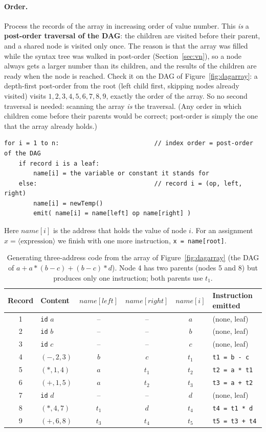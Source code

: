 \documentclass[11pt,a4paper]{article}
\begin{document}
\paragraph{Order.} Process the records of the array in increasing order of value number. This \emph{is} a \textbf{post-order traversal of the DAG}: the children are visited before their parent, and a shared node is visited only once. The reason is that the array was filled while the syntax tree was walked in post-order (Section~\ref{sec:vn}), so a node always gets a larger number than its children, and the results of the children are ready when the node is reached. Check it on the DAG of Figure~\ref{fig:dagarray}: a depth-first post-order from the root (left child first, skipping nodes already visited) visits $1,2,3,4,5,6,7,8,9$, exactly the order of the array. So no second traversal is needed: scanning the array \emph{is} the traversal. (Any order in which children come before their parents would be correct; post-order is simply the one that the array already holds.)

\begin{lstlisting}
for i = 1 to n:                          // index order = post-order of the DAG
    if record i is a leaf:
        name[i] = the variable or constant it stands for
    else:                                // record i = (op, left, right)
        name[i] = newTemp()
        emit( name[i] = name[left] op name[right] )
\end{lstlisting}
Here $\mathit{name}[i]$ is the address that holds the value of node $i$. For an assignment $x = \langle\text{expression}\rangle$ we finish with one more instruction, \texttt{x = name[root]}.

\begin{table}[H]
\centering
\small
\begin{tabular}{@{}c l c c c l@{}}
\toprule
\textbf{Record} & \textbf{Content} & $\mathit{name}[\mathit{left}]$ & $\mathit{name}[\mathit{right}]$ & $\mathit{name}[i]$ & \textbf{Instruction emitted} \\ \midrule
1 & \texttt{id} $a$ & -- & -- & $a$ & (none, leaf) \\
2 & \texttt{id} $b$ & -- & -- & $b$ & (none, leaf) \\
3 & \texttt{id} $c$ & -- & -- & $c$ & (none, leaf) \\
4 & $(-,2,3)$ & $b$ & $c$ & $t_1$ & \texttt{t1 = b - c} \\
5 & $(*,1,4)$ & $a$ & $t_1$ & $t_2$ & \texttt{t2 = a * t1} \\
6 & $(+,1,5)$ & $a$ & $t_2$ & $t_3$ & \texttt{t3 = a + t2} \\
7 & \texttt{id} $d$ & -- & -- & $d$ & (none, leaf) \\
8 & $(*,4,7)$ & $t_1$ & $d$ & $t_4$ & \texttt{t4 = t1 * d} \\
9 & $(+,6,8)$ & $t_3$ & $t_4$ & $t_5$ & \texttt{t5 = t3 + t4} \\ \bottomrule
\end{tabular}
\caption{Generating three-address code from the array of Figure~\ref{fig:dagarray} (the DAG of $a + a*(b-c) + (b-c)*d$). Node 4 has two parents (nodes 5 and 8) but produces only one instruction; both parents use $t_1$.}
\end{table}
\end{document}
